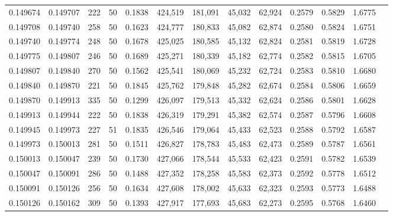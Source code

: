 \begin{tabular}{rrrrrrrrrrrrr}
0.149674 & 0.149707 &   222 &  50 &                                     0.1838 & 424,519 & 181,091 &  45,032 &  62,924 & 0.2579 & 0.5829 & 1.6775 \\
0.149708 & 0.149740 &   258 &  50 &                                     0.1623 & 424,777 & 180,833 &  45,082 &  62,874 & 0.2580 & 0.5824 & 1.6751 \\
0.149740 & 0.149774 &   248 &  50 &                                     0.1678 & 425,025 & 180,585 &  45,132 &  62,824 & 0.2581 & 0.5819 & 1.6728 \\
0.149775 & 0.149807 &   246 &  50 &                                     0.1689 & 425,271 & 180,339 &  45,182 &  62,774 & 0.2582 & 0.5815 & 1.6705 \\
0.149807 & 0.149840 &   270 &  50 &                                     0.1562 & 425,541 & 180,069 &  45,232 &  62,724 & 0.2583 & 0.5810 & 1.6680 \\
0.149840 & 0.149870 &   221 &  50 &                                     0.1845 & 425,762 & 179,848 &  45,282 &  62,674 & 0.2584 & 0.5806 & 1.6659 \\
0.149870 & 0.149913 &   335 &  50 &                                     0.1299 & 426,097 & 179,513 &  45,332 &  62,624 & 0.2586 & 0.5801 & 1.6628 \\
0.149913 & 0.149944 &   222 &  50 &                                     0.1838 & 426,319 & 179,291 &  45,382 &  62,574 & 0.2587 & 0.5796 & 1.6608 \\
0.149945 & 0.149973 &   227 &  51 &                                     0.1835 & 426,546 & 179,064 &  45,433 &  62,523 & 0.2588 & 0.5792 & 1.6587 \\
0.149973 & 0.150013 &   281 &  50 &                                     0.1511 & 426,827 & 178,783 &  45,483 &  62,473 & 0.2589 & 0.5787 & 1.6561 \\
0.150013 & 0.150047 &   239 &  50 &                                     0.1730 & 427,066 & 178,544 &  45,533 &  62,423 & 0.2591 & 0.5782 & 1.6539 \\
0.150047 & 0.150091 &   286 &  50 &                                     0.1488 & 427,352 & 178,258 &  45,583 &  62,373 & 0.2592 & 0.5778 & 1.6512 \\
0.150091 & 0.150126 &   256 &  50 &                                     0.1634 & 427,608 & 178,002 &  45,633 &  62,323 & 0.2593 & 0.5773 & 1.6488 \\
0.150126 & 0.150162 &   309 &  50 &                                     0.1393 & 427,917 & 177,693 &  45,683 &  62,273 & 0.2595 & 0.5768 & 1.6460 \\

\end{tabular}

